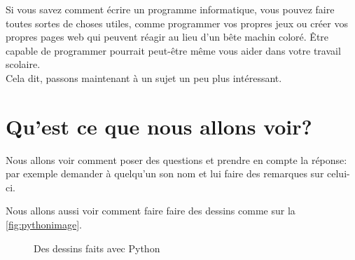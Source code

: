 Si vous savez comment écrire un programme informatique, vous pouvez faire toutes sortes de choses utiles, comme programmer vos propres jeux ou créer vos propres pages web qui peuvent réagir au lieu d'un bête machin coloré. Être capable de programmer pourrait peut-être même vous aider dans votre travail scolaire.
\\


Cela dit, passons maintenant à un sujet un peu plus intéressant.

\section{Qu'est ce que nous allons voir?}
Nous allons voir comment poser des questions et prendre en compte la réponse: par exemple demander à quelqu'un son nom et lui faire des remarques sur celui-ci.

Nous allons aussi voir comment faire faire des dessins comme sur la \autoref{fig:pythonimage}.

\begin{figure}[!ht]
\capstart
\centering
{}
\caption{Des dessins faits avec Python}\label{fig:pythonimage}
\end{figure}


